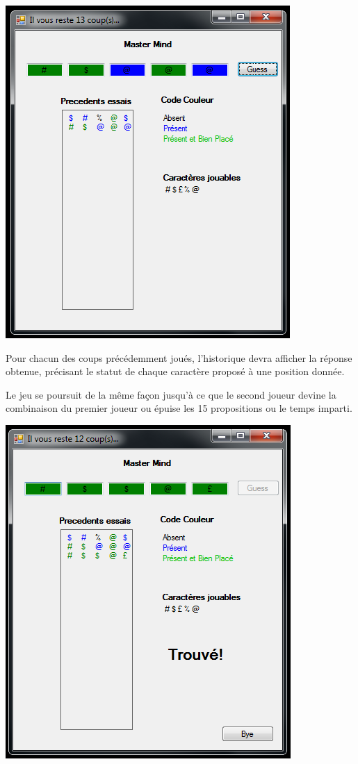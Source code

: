\documentclass[10pt,a4paper,oneside]{article}
\begin{document}
\begin{center}
    \includegraphics[scale=0.6]{pictures/player2try2answer.png}
\end{center}

Pour chacun des coups précédemment joués, l'historique devra afficher la réponse obtenue, précisant le statut de chaque caractère proposé à une position donnée.

\medskip

Le jeu se poursuit de la même façon jusqu'à ce que le second joueur devine la combinaison du premier joueur ou épuise les 15 propositions ou le temps imparti.

\begin{center}
    \includegraphics[scale=0.6]{pictures/player2victory.png}
\end{center}
\end{document}
